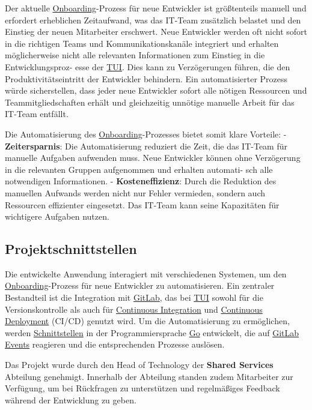Der aktuelle \hyperlink{Onboarding}{\textcolor{AOBlau}{Onboarding}}-Prozess für neue Entwickler ist größtenteils manuell und erfordert erheblichen Zeitaufwand, was das IT-Team zusätzlich belastet und den Einstieg der neuen Mitarbeiter erschwert. Neue Entwickler werden oft nicht sofort in die richtigen Teams und Kommunikationskanäle integriert und erhalten möglicherweise nicht alle relevanten Informationen zum Einstieg in die Entwicklungsproz-
esse der \hyperlink{TUI}{\textcolor{AOBlau}{TUI}}. Dies kann zu Verzögerungen führen, die den Produktivitätseintritt der Entwickler behindern. Ein automatisierter Prozess würde sicherstellen, dass jeder neue Entwickler sofort alle nötigen Ressourcen und Teammitgliedschaften erhält und gleichzeitig unnötige manuelle Arbeit für das IT-Team entfällt.

Die Automatisierung des \hyperlink{Onboarding}{\textcolor{AOBlau}{Onboarding}}-Prozesses bietet somit klare Vorteile:
- \textbf{Zeitersparnis}: Die Automatisierung reduziert die Zeit, die das IT-Team für manuelle Aufgaben aufwenden muss. Neue Entwickler können ohne Verzögerung in die relevanten Gruppen aufgenommen und erhalten automati-
sch alle notwendigen Informationen.
- \textbf{Kosteneffizienz}: Durch die Reduktion des manuellen Aufwands werden nicht nur Fehler vermieden, sondern auch Ressourcen effizienter eingesetzt. Das IT-Team kann seine Kapazitäten für wichtigere Aufgaben nutzen.


\subsection{Projektschnittstellen} 
\label{sec:Projektschnittstellen}

Die entwickelte Anwendung interagiert mit verschiedenen Systemen, um den \hyperlink{Onboarding}{\textcolor{AOBlau}{Onboarding}}-Prozess für neue Entwickler zu automatisieren. Ein zentraler Bestandteil ist die Integration mit \hyperlink{GitLab}{\textcolor{AOBlau}{GitLab}}, das bei \hyperlink{TUI}{\textcolor{AOBlau}{TUI}} sowohl für die Versionskontrolle als auch für \hyperlink{CI}{\textcolor{AOBlau}{Continuous Integration}} und \hyperlink{CD}{\textcolor{AOBlau}{Continuous Deployment}} (CI/CD) genutzt wird. Um die Automatisierung zu ermöglichen, werden \hyperlink{Schnittstelle}{\textcolor{AOBlau}{Schnittstellen}} in der Programmiersprache \hyperlink{Go}{\textcolor{AOBlau}{Go}} entwickelt, die auf \hyperlink{GitLab}{\textcolor{AOBlau}{GitLab Events}} reagieren und die entsprechenden Prozesse auslösen.

Das Projekt wurde durch den Head of Technology der \textbf{Shared Services} Abteilung genehmigt. Innerhalb der Abteilung standen zudem Mitarbeiter zur Verfügung, um bei Rückfragen zu unterstützen und regelmäßiges Feedback während der Entwicklung zu geben.

